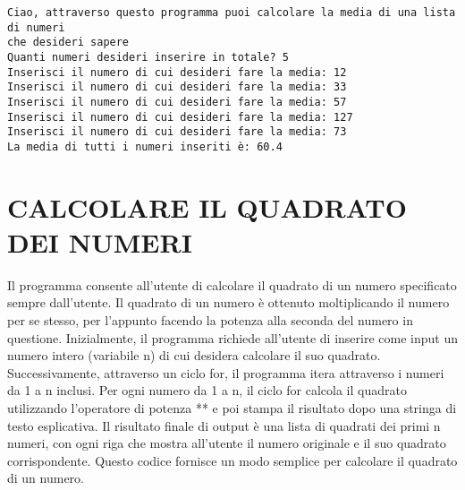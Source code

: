 \documentclass[11pt]{article}
\begin{document}
    \begin{Verbatim}[commandchars=\\\{\}]
Ciao, attraverso questo programma puoi calcolare la media di una lista di numeri
che desideri sapere
Quanti numeri desideri inserire in totale? 5
Inserisci il numero di cui desideri fare la media: 12
Inserisci il numero di cui desideri fare la media: 33
Inserisci il numero di cui desideri fare la media: 57
Inserisci il numero di cui desideri fare la media: 127
Inserisci il numero di cui desideri fare la media: 73
La media di tutti i numeri inseriti è: 60.4
    \end{Verbatim}

    \section{CALCOLARE IL QUADRATO DEI
NUMERI}\label{calcolare-il-quadrato-dei-numeri}

    Il programma consente all'utente di calcolare il quadrato di un numero
specificato sempre dall'utente. Il quadrato di un numero è ottenuto
moltiplicando il numero per se stesso, per l'appunto facendo la potenza
alla seconda del numero in questione. Inizialmente, il programma
richiede all'utente di inserire come input un numero intero (variabile
n) di cui desidera calcolare il suo quadrato. Successivamente,
attraverso un ciclo for, il programma itera attraverso i numeri da 1 a n
inclusi. Per ogni numero da 1 a n, il ciclo for calcola il quadrato
utilizzando l'operatore di potenza ** e poi stampa il risultato dopo una
stringa di testo esplicativa. Il risultato finale di output è una lista
di quadrati dei primi n numeri, con ogni riga che mostra all'utente il
numero originale e il suo quadrato corrispondente. Questo codice
fornisce un modo semplice per calcolare il quadrato di un numero.
\end{document}
